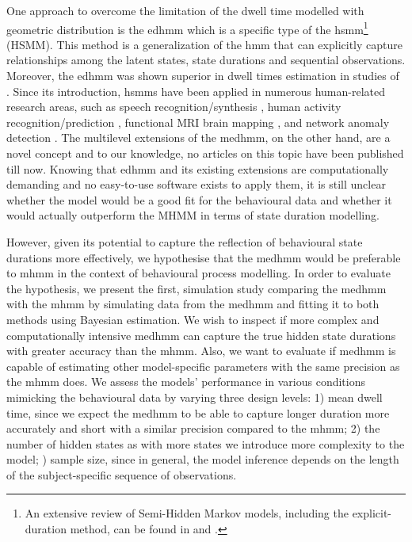 One approach to overcome the limitation of the dwell time modelled with geometric distribution is the \acl{edhmm} \cite[EDHMM; ][]{freguson1980variable} which is a specific type of the \acl{hsmm}\footnote{An extensive review of Semi-Hidden Markov models, including the explicit-duration method, can be found in \cite{murphy_hidden_nodate} and \cite{Yu_2010}.} (HSMM). This method is a generalization of the \ac{hmm} that can explicitly capture relationships among the latent states, state durations and sequential observations. Moreover, the \ac{edhmm} was shown superior in dwell times estimation in studies of \cite{Shappell_Caffo_Pekar_Lindquist_2019,Ruiz_Suarez_2022}. Since its introduction, \ac{hsmm}s have been applied in numerous human-related research areas, such as speech recognition/synthesis \citep{russell1985explicit,Juang_Rabiner_1991}, human activity recognition/prediction \citep{4118806,duong2005activity,van2010activity}, functional MRI brain mapping \citep{faisan2002hidden,1388575}, and network anomaly detection \citep{duong2005activity,Tan_Xi_2008,Bang_Cho_Kang_2017}. The multilevel extensions of the \ac{medhmm}, on the other hand, are a novel concept and to our knowledge, no articles on this topic have been published till now. Knowing that \ac{edhmm} and its existing extensions are computationally demanding \citep[][]{mitchell_complexity_1995,johnson_bayesian_nodate} and no easy-to-use software exists to apply them, it is still unclear whether the model would be a good fit for the behavioural data and whether it would actually outperform the MHMM in terms of state duration modelling.

However, given its potential to capture the reflection of behavioural state durations more effectively, we hypothesise that the \ac{medhmm} would be preferable to \ac{mhmm} in the context of behavioural process modelling. In order to evaluate the hypothesis, we present the first, simulation study comparing the \ac{medhmm} with the \ac{mhmm} by simulating data from the \ac{medhmm} and fitting it to both methods using Bayesian estimation. We wish to inspect if more complex and computationally intensive \ac{medhmm} can capture the true hidden state durations with greater accuracy than the \ac{mhmm}. Also, we want to evaluate if \ac{medhmm} is capable of estimating other model-specific parameters with the same precision as the \ac{mhmm} does. We assess the models' performance in various conditions mimicking the behavioural data by varying three design levels: 1) mean dwell time, since we expect the \ac{medhmm} to be able to capture longer duration more accurately and short with a similar precision compared to the \ac{mhmm}; 2) the number of hidden states as with more states we introduce more complexity to the model; ) sample size, since in general, the model inference depends on the length of the subject-specific sequence of observations.

